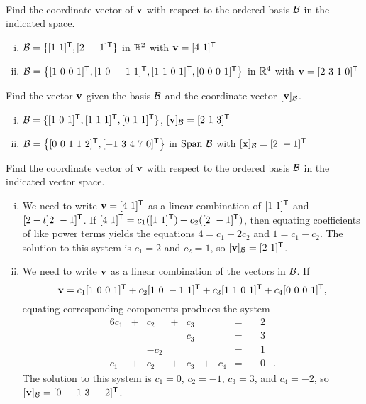 
\ExampleIntro

\begin{example} ~
	\ba
	\item Find the coordinate vector of $\mathbf{v}$ with respect to the ordered basis $\mathcal{B}$ in the indicated space.
		\begin{enumerate}[i.]
		\item $\CB = \{[1 \ 1]^{\tr}, [2 \ -1]^{\tr}\}$ in $\mathbb{R}^2$ with $\vv = [4 \ 1]^{\tr}$
	
		\item $\mathcal{B} = \left\{[1 \ 0 \ 0 \ 1]^{\mathsf{T}}, [1 \  0 \ -1 \ 1]^{\mathsf{T}}, [1 \ 1 \ 0 \ 1]^{\mathsf{T}},  [0 \ 0 \ 0  \ 1]^{\mathsf{T}} \right\}$ in $\mathbb{R}^4$ with $\mathbf{v} = [2 \ 3 \ 1 \ 0]^{\mathsf{T}}$
		\end{enumerate}
	
	\item Find the vector $\mathbf{v}$ given the basis $\mathcal{B}$ and the coordinate vector $[\mathbf{v}]_{\mathcal{B}}$.
		\begin{enumerate}[i.]
		\item $\CB = \{[1\ 0 \ 1]^{\tr}, [1 \ 1 \ 1]^{\tr}, [0 \ 1 \ 1]^{\tr}\}$, $[\mathbf{v}]_{\mathcal{B}} = [2 \ 1 \ 3]^{\mathsf{T}}$
		
		\item $\CB = \left\{[0 \ 0 \ 1 \ 1 \ 2]^{\tr}, [-1 \ 3 \ 4 \ 7 \ 0]^{\tr}\right\}$ in $\text{Span} \ \mathcal{B}$ with $[\mathbf{x}]_{\mathcal{B}} = [2 \ -1]^{\mathsf{T}}$
		
		\end{enumerate}
	
	\ea

\ExampleSolution

	\ba
	\item Find the coordinate vector of $\mathbf{v}$ with respect to the ordered basis $\mathcal{B}$ in the indicated vector space.
		\begin{enumerate}[i.]
		\item We need to write $\vv =[4 \ 1]^{\tr}$ as a linear combination of $[1 \ 1]^{\mathsf{T}}$ and $[2-t]2 \ -1]^{\mathsf{T}}$. If $[4 \ 1]^{\tr} = c_1([1 \ 1]^{\tr}) + c_2([2 \ -1]^{\tr})$, then equating coefficients of like power terms yields the equations $4 = c_1 +2c_2$ and $1 = c_1-c_2$. The solution to this system is $c_1 = 2$ and $c_2 = 1$, so $[\vv]_{\CB} = [2 \ 1]^{\tr}$.  
		
			
		\item We need to write $\mathbf{v}$ as a linear combination of the vectors in $\mathcal{B}$. If 
\[\mathbf{v} = c_1[1 \ 0 \ 0 \ 1]^{\mathsf{T}} + c_2 [1 \  0 \ -1 \ 1]^{\mathsf{T}} + c_3 [1 \ 1 \ 0 \ 1]^{\mathsf{T}} + c_4  [0 \ 0 \ 0  \ 1]^{\mathsf{T}},\]
equating corresponding components produces the system 
\begin{alignat*}{6}
{}c_1 	&{}+{}	&{}c_2	&{}+{}	&{}c_3	&{}{}		&{}		&{}={}	&\ {}&2&{}\\
{}		&{}{}		&{}		&{}{}		&{}c_3	&{}{}		&{}		&{}={} 	&\ {}&3&{} \\
{}		&{}{}		&{-}c_2	&{}{}		&{}		&{}{}		&{}		&{}={} 	&\ {}&1&{} \\
{}c_1		&{}+{}	&{}c_2	&{}+{}	&{}c_3	&{}+{}	&{}c_4	&{}={}	& \ {}&0&{.}
\end{alignat*}
The solution to this system is $c_1 = 0$, $c_2 = -1$, $c_3 = 3$, and $c_4 = -2$, so $[\vv]_{\CB} = [0 \ -1 \ 3 \ -2]^{\tr}$.


\end{enumerate}
\end{example}
